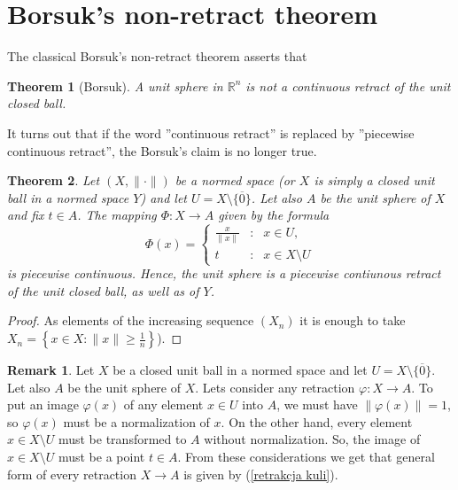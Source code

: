 \documentclass{amsart}
\newtheorem{Th}{Theorem}
\theoremstyle{definition}
\newtheorem{Uw}{Remark}
\newcommand\mR{{\mathbb R}}
\newcommand\cn{\colon}
\newcommand\wi{\geqslant}
\newcommand\ol{\overline}
\newcommand\fii{{\varphi}}
\begin{document}

\section{Borsuk's non-retract theorem}

The classical Borsuk's non-retract theorem \cite[Theorem 8]{ParkJeong} asserts that
\begin{Th}[Borsuk]
A unit sphere in $\mR^n$ is not a continuous retract of the unit closed ball.
\end{Th}

It turns out that if the word ''continuous retract'' is replaced by ''piecewise continuous retract'',
the Borsuk's claim is no longer true.

\begin{Th}\label{przyk_kula_sfera}
Let $(X,\|\cdot\|)$ be a normed space (or $X$ is simply a closed unit ball in a normed space $Y$) and let $U=X\setminus\{\ol0\}$. 
Let also $A$ be the unit sphere of $X$ and fix $t\in A$. The mapping $\Phi\cn X\to A$ given by the formula
\begin{equation}\label{retrakcja kuli}
\Phi(x)=\left\{\begin{array}{lll}
\frac{x}{\|x\|} & \textrm{:} & x\in U,\\
t & \textrm{:} & x\in X\setminus U
\end{array} \right.
\end{equation}
is piecewise continuous. Hence, the unit sphere is a piecewise contiunous retract of the unit closed ball,
as well as of $Y$.
\end{Th}

\begin{proof}
As elements of the increasing sequence $\left(X_n\right)$ it is enough to take
$X_n=\left\{x\in X:\|x\|\wi\frac{1}{n}\right\}$).
\end{proof}

\begin{Uw}
Let $X$ be a closed unit ball in a normed space and let $U=X\setminus\{\ol0\}$. 
Let also $A$ be the unit sphere of $X$. Lets consider any retraction $\fii\cn X\to A$.
To put an image $\fii(x)$ of any element $x\in U$ into $A$,
we must have $\|\fii(x)\|=1$, so $\fii(x)$ must be a normalization of $x$. On the other hand,
every element $x\in X\setminus U$ must be transformed to $A$ without normalization.
So, the image of $x\in X\setminus U$ must be a point $t\in A$. From these considerations we get
that general form of every retraction $X\to A$ is given by (\ref{retrakcja kuli}).
\end{Uw}
\end{document}
